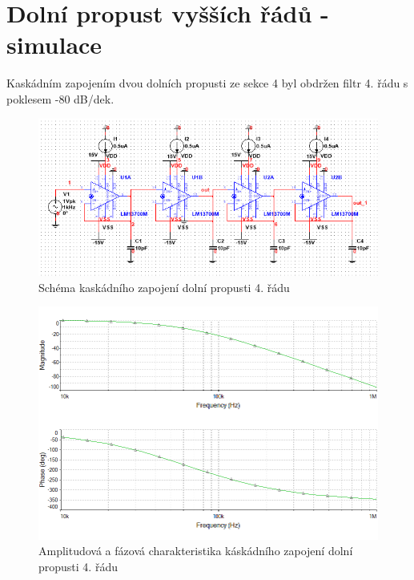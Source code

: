 \documentclass[twoside]{article}
\begin{document}
\section{Dolní propust vyšších řádů - simulace}
Kaskádním zapojením dvou dolních propusti ze sekce 4 byl obdržen filtr 4. řádu s poklesem -80 dB/dek. 
\begin{figure}[H]
\centering
\includegraphics[scale=0.75]{1506.png}
\caption{Schéma kaskádního zapojení dolní propusti 4. řádu}
\end{figure}
\begin{figure}[H]
\centering
\includegraphics[scale=0.75]{15062.png}
\caption{Amplitudová a fázová charakteristika káskádního zapojení dolní propusti 4. řádu}
\end{figure}
\end{document}
